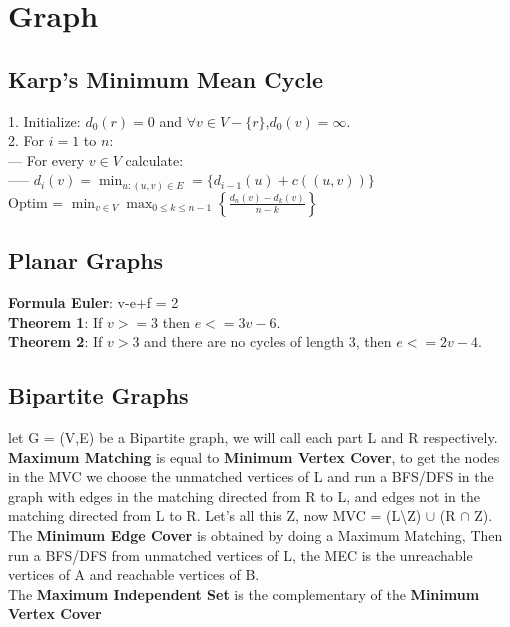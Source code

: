 \chapter{Graph}
\section{Karp's Minimum Mean Cycle}
1. Initialize: $d_0(r) = 0$ and $\forall v\in V - \{r\}$,$d_0(v) = \infty$.\\
2. For $i = 1$ to $n$:\\
--- For every $v\in V$ calculate:\\
----- $d_i(v) = \min_{u:(u,v)\in E} = \{d_{i - 1}(u) + c((u,v))\}$\\
Optim = $\min_{v\in V}\max_{0\leq k\leq n - 1}\left\{\frac{d_n(v) - d_k(v)}{n - k}\right\}$
\section{Planar Graphs}
\textbf{Formula Euler}: v-e+f = 2\\
\textbf{Theorem 1}: If $v>= 3$ then $e<=3v-6$.\\
\textbf{Theorem 2}: If $v>3$ and there are no cycles of length 3, then $e<= 2v-4$.\\

\section{Bipartite Graphs}
let G = (V,E) be a Bipartite graph, we will call each part L and R respectively.\\
\textbf{Maximum Matching} is equal to \textbf{Minimum Vertex Cover}, to get the nodes in the MVC we choose the unmatched vertices of L
and run a BFS/DFS in the graph with edges in the matching directed from R to L, and edges not in the matching directed from L to R. Let's all this Z,
now MVC = (L\textbackslash Z) $\cup$ (R $\cap$ Z). \\
The \textbf{Minimum Edge Cover} is obtained by doing a Maximum Matching, Then run a BFS/DFS from unmatched vertices of L, 
the MEC is the unreachable vertices of A and reachable vertices of B.\\
The \textbf{Maximum Independent Set} is the complementary of the \textbf{Minimum Vertex Cover}
